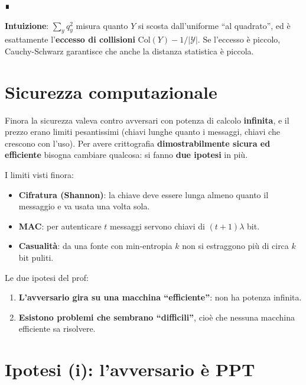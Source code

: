 ∎

\textbf{Intuizione}: \(\sum_y q_y^2\) misura quanto \(Y\) si scosta dall'uniforme ``al quadrato'', ed è esattamente l'\textbf{eccesso di collisioni} \(\text{Col}(Y) - 1/|\mathcal{Y}|\). Se l'eccesso è piccolo, Cauchy-Schwarz garantisce che anche la distanza statistica è piccola.

\section{Sicurezza computazionale}

\begin{inbreve}

Finora la sicurezza valeva contro avversari con potenza di calcolo \textbf{infinita}, e il prezzo erano limiti pesantissimi (chiavi lunghe quanto i messaggi, chiavi che crescono con l'uso). Per avere crittografia \textbf{dimostrabilmente sicura ed efficiente} bisogna cambiare qualcosa: si fanno \textbf{due ipotesi} in più.

\end{inbreve}

I limiti visti finora:

\begin{itemize}
\tightlist
\item
  \textbf{Cifratura (Shannon)}: la chiave deve essere lunga almeno quanto il messaggio e va usata una volta sola.
\item
  \textbf{MAC}: per autenticare \(t\) messaggi servono chiavi di \((t+1)\lambda\) bit.
\item
  \textbf{Casualità}: da una fonte con min-entropia \(k\) non si estraggono più di circa \(k\) bit puliti.
\end{itemize}

Le due ipotesi del prof:

\begin{enumerate}
\def\labelenumi{\arabic{enumi}.}
\tightlist
\item
  \textbf{L'avversario gira su una macchina ``efficiente''}: non ha potenza infinita.
\item
  \textbf{Esistono problemi che sembrano ``difficili''}, cioè che nessuna macchina efficiente sa risolvere.
\end{enumerate}

\section{Ipotesi (i): l'avversario è PPT}

